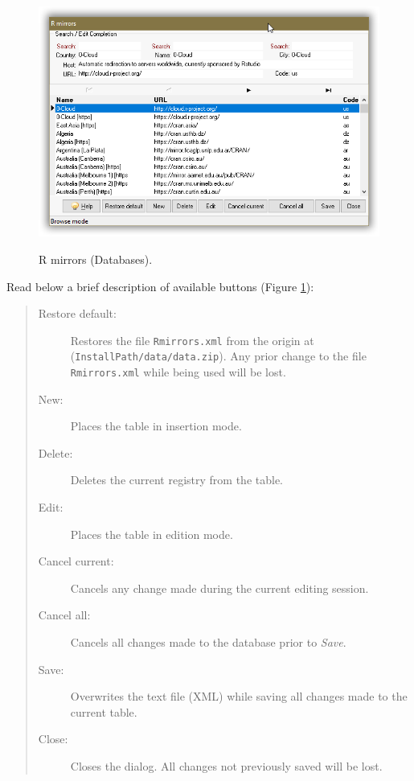 \begin{figure}[H]
  \includegraphics[scale=0.35]{./res/mirrors_dlg.png}\\
  \caption{R mirrors (Databases).}
  \label{fig:mirrors_dlg_1}
\end{figure}

Read below a brief description of available buttons (Figure \ref{fig:mirrors_dlg_1}):

\begin{quote}
  \begin{footnotesize}
    \begin{description}
      \item[Restore default:]
        Restores the file \texttt{Rmirrors.xml} from the origin at
        (\texttt{InstallPath/data/data.zip}). Any prior change to the
        file \texttt{Rmirrors.xml} while being used will be lost.
      \item[New:]
        Places the table in insertion mode.
      \item[Delete:]
        Deletes the current registry from the table.
      \item[Edit:]
        Places the table in edition mode.
      \item[Cancel current:]
        Cancels any change made during the current editing session.
      \item[Cancel all:]
        Cancels all changes made to the database prior to \textit{Save}.
      \item[Save:]
        Overwrites the text file (XML) while saving all changes made to the current table.
      \item[Close:]
        Closes the dialog. All changes not previously saved will be lost.
    \end{description}
  \end{footnotesize}
\end{quote}
